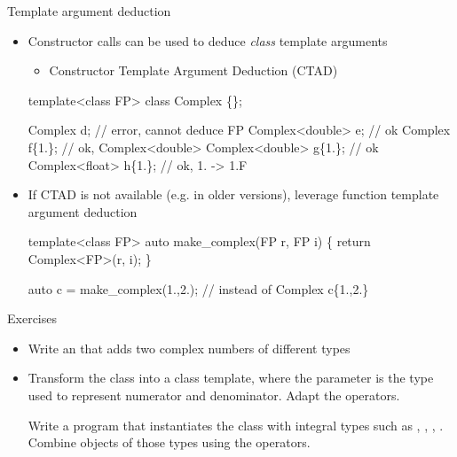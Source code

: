 \begin{frame}[fragile]{Template argument deduction \insertcontinuationtext}

  \begin{itemize}
  \item Constructor calls can be used to deduce \textit{class} template arguments
    \begin{itemize}
    \item Constructor Template Argument Deduction (CTAD)
    \end{itemize}
    \begin{codeblock}
template<class FP> class Complex \{\ddd\};

Complex d;             // error, cannot deduce FP
Complex<double> e;     // ok
Complex f\{1.\};         // ok, Complex<double>
Complex<double> g\{1.\}; // ok
Complex<float> h\{1.\};  // ok, 1. -> 1.F\end{codeblock}
  \item<2-> If CTAD is not available (e.g. in older \Cpp{} versions), leverage
    function template argument deduction
    \begin{codeblock}
template<class FP>
auto make_complex(FP r, FP i) \{
  return Complex<FP>(r, i);
\}

auto c = make_complex(1.,2.); // instead of Complex c\{1.,2.\}\end{codeblock}
  \end{itemize}

\end{frame}

\begin{frame}{Exercises}

  \begin{itemize}
  \item Write an  that adds two complex numbers of different types

  \item Transform the  class into a class template, where the
    parameter is the type used to represent numerator and denominator. Adapt the
    operators.

    Write a program that instantiates the  class with integral
    types such as , , , . Combine objects of those types using the operators.
  \end{itemize}

\end{frame}

